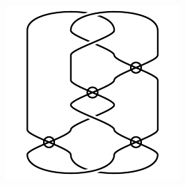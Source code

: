 \begin{figure}[H]
\begin{minipage}[b]{.18\linewidth}
\end{minipage}
\begin{minipage}[b]{.18\linewidth}
\centering
\includegraphics[width=\linewidth]{../data/virtual_4_96.png}
\end{minipage}
\end{figure}

